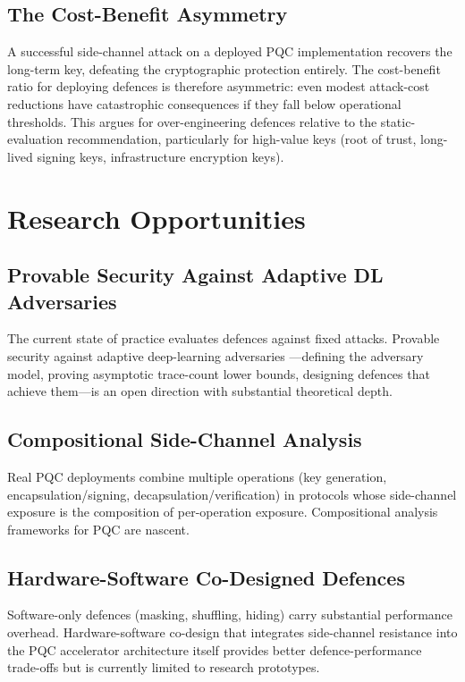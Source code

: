 \documentclass[sigconf,nonacm]{acmart}
\begin{document}
\subsection{The Cost-Benefit Asymmetry}

A successful side-channel attack on a deployed PQC implementation
recovers the long-term key, defeating the cryptographic protection
entirely. The cost-benefit ratio for deploying defences is therefore
asymmetric: even modest attack-cost reductions have catastrophic
consequences if they fall below operational thresholds. This argues
for over-engineering defences relative to the static-evaluation
recommendation, particularly for high-value keys (root of trust,
long-lived signing keys, infrastructure encryption keys).

\section{Research Opportunities}

\subsection{Provable Security Against Adaptive DL Adversaries}

The current state of practice evaluates defences against fixed
attacks. Provable security against adaptive deep-learning adversaries
---defining the adversary model, proving asymptotic trace-count
lower bounds, designing defences that achieve them---is an open
direction with substantial theoretical depth.

\subsection{Compositional Side-Channel Analysis}

Real PQC deployments combine multiple operations (key generation,
encapsulation/signing, decapsulation/verification) in protocols whose
side-channel exposure is the composition of per-operation exposure.
Compositional analysis frameworks for PQC are nascent.

\subsection{Hardware-Software Co-Designed Defences}

Software-only defences (masking, shuffling, hiding) carry substantial
performance overhead. Hardware-software co-design that integrates
side-channel resistance into the PQC accelerator architecture itself
provides better defence-performance trade-offs but is currently
limited to research prototypes.
\end{document}
